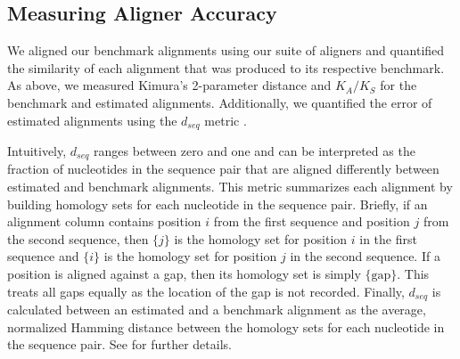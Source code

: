 \documentclass[12pt,letterpaper]{article}
\begin{document}

\subsection*{Measuring Aligner Accuracy}

We aligned our benchmark alignments using our suite of aligners and quantified the similarity of each alignment that was produced to its respective benchmark. As above, we measured Kimura's 2-parameter distance \citep{kimura1980simple} and $K_A/K_S$ \citep{ka_ks_li_1993} for the benchmark and estimated alignments. Additionally, we quantified the error of estimated alignments using the $d_{seq}$ metric \citep{metrics_blackburne_whelan_2011}.

Intuitively, $d_{seq}$ ranges between zero and one and can be interpreted as the fraction of nucleotides in the sequence pair that are aligned differently between estimated and benchmark alignments. This metric summarizes each alignment by building homology sets for each nucleotide in the sequence pair. Briefly, if an alignment column contains position $i$ from the first sequence and position $j$ from the second sequence, then $\{j\}$ is the homology set for position $i$ in the first sequence and $\{i\}$ is the homology set for position $j$ in the second sequence. If a position is aligned against a gap, then its homology set is simply $\{\text{gap}\}$. This treats all gaps equally as the location of the gap is not recorded. Finally, $d_{seq}$ is calculated  between an estimated and a benchmark alignment as the average, normalized Hamming distance between the homology sets for each nucleotide in the sequence pair. See \cite{metrics_blackburne_whelan_2011} for further details.

\end{document}
